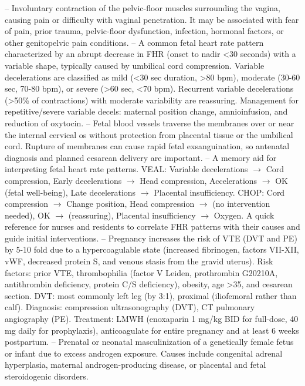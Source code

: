 -- Involuntary contraction of the pelvic-floor muscles surrounding the vagina, causing pain or difficulty with vaginal penetration. It may be associated with fear of pain, prior trauma, pelvic-floor dysfunction, infection, hormonal factors, or other genitopelvic pain conditions.
-- A common fetal heart rate pattern characterized by an abrupt decrease in FHR (onset to nadir <30 seconds) with a variable shape, typically caused by umbilical cord compression. Variable decelerations are classified as mild (<30 sec duration, >80 bpm), moderate (30-60 sec, 70-80 bpm), or severe (>60 sec, <70 bpm). Recurrent variable decelerations (>50\% of contractions) with moderate variability are reassuring. Management for repetitive/severe variable decels: maternal position change, amnioinfusion, and reduction of oxytocin.
-- Fetal blood vessels traverse the membranes over or near the internal cervical os without protection from placental tissue or the umbilical cord. Rupture of membranes can cause rapid fetal exsanguination, so antenatal diagnosis and planned cesarean delivery are important.
-- A memory aid for interpreting fetal heart rate patterns. VEAL: Variable decelerations $\rightarrow$ Cord compression, Early decelerations $\rightarrow$ Head compression, Accelerations $\rightarrow$ OK (fetal well-being), Late decelerations $\rightarrow$ Placental insufficiency. CHOP: Cord compression $\rightarrow$ Change position, Head compression $\rightarrow$ (no intervention needed), OK $\rightarrow$ (reassuring), Placental insufficiency $\rightarrow$ Oxygen. A quick reference for nurses and residents to correlate FHR patterns with their causes and guide initial interventions.
-- Pregnancy increases the risk of VTE (DVT and PE) by 5-10 fold due to a hypercoagulable state (increased fibrinogen, factors VII-XII, vWF, decreased protein S, and venous stasis from the gravid uterus). Risk factors: prior VTE, thrombophilia (factor V Leiden, prothrombin G20210A, antithrombin deficiency, protein C/S deficiency), obesity, age >35, and cesarean section. DVT: most commonly left leg (by 3:1), proximal (iliofemoral rather than calf). Diagnosis: compression ultrasonography (DVT), CT pulmonary angiography (PE). Treatment: LMWH (enoxaparin 1 mg/kg BID for full-dose, 40 mg daily for prophylaxis), anticoagulate for entire pregnancy and at least 6 weeks postpartum.
-- Prenatal or neonatal masculinization of a genetically female fetus or infant due to excess androgen exposure. Causes include congenital adrenal hyperplasia, maternal androgen-producing disease, or placental and fetal steroidogenic disorders.
